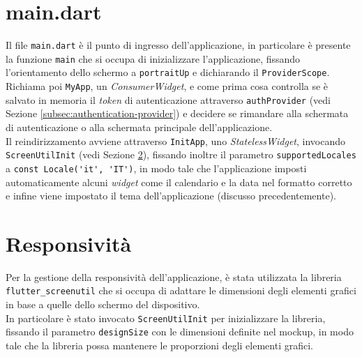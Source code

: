 \section{main.dart}
\label{sec:main}

Il file \lstinline{main.dart} è il punto di ingresso dell'applicazione, in particolare è presente la funzione \lstinline{main} che si occupa di inizializzare l'applicazione, fissando l'orientamento dello schermo a \lstinline{portraitUp} e dichiarando il \lstinline{ProviderScope}. \\
Richiama poi \lstinline{MyApp}, un \emph{ConsumerWidget}, e come prima cosa controlla se è salvato in memoria il \emph{token} di autenticazione attraverso \lstinline{authProvider} (vedi Sezione \ref{subsec:authentication-provider}) e decidere se rimandare alla schermata di autenticazione o alla schermata principale dell'applicazione. \\
Il reindirizzamento avviene attraverso \lstinline{InitApp}, uno \emph{StatelessWidget}, invocando \lstinline{ScreenUtilInit} (vedi Sezione \ref{sec:responsivity}), fissando inoltre il parametro \lstinline{supportedLocales} a \lstinline{const Locale('it', 'IT')}, in modo tale che l'applicazione imposti automaticamente alcuni \emph{widget} come il calendario e la data nel formatto corretto e infine viene impostato il tema dell'applicazione (discusso precedentemente).

\section{Responsività}
\label{sec:responsivity}

Per la gestione della responsività dell'applicazione, è stata utilizzata la libreria \lstinline{flutter_screenutil} \cite{site:screenutil} che si occupa di adattare le dimensioni degli elementi grafici in base a quelle dello schermo del dispositivo. \\
In particolare è stato invocato \lstinline{ScreenUtilInit} per inizializzare la libreria, fissando il parametro \lstinline{designSize} con le dimensioni definite nel \gls{mockup}\glsoccur, in modo tale che la libreria possa mantenere le proporzioni degli elementi grafici. 



